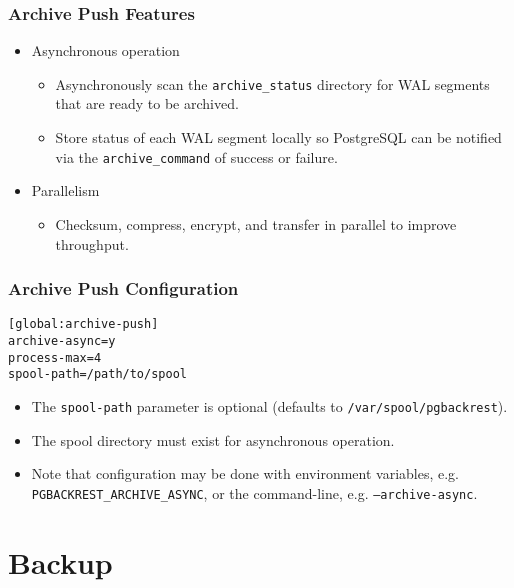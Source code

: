 \begin{frame}
    \frametitle{Archive Push Features}

    \begin{itemize}
        \item Asynchronous operation

        \begin{itemize}
            \item Asynchronously scan the \texttt{archive\_status} directory for WAL segments that are ready to be archived.\pause
            \item Store status of each WAL segment locally so PostgreSQL can be notified via the \texttt{archive\_command} of success or failure.\pause
        \end{itemize}

        \item Parallelism

        \begin{itemize}
            \item Checksum, compress, encrypt, and transfer in parallel to improve throughput.
        \end{itemize}
    \end{itemize}
\end{frame}

\begin{frame}[fragile]
    \frametitle{Archive Push Configuration}

    \vspace{.75em}\begin{lstlisting}[title=pgbackrest.conf]
[global:archive-push]
archive-async=y
process-max=4
spool-path=/path/to/spool
    \end{lstlisting}\pause\vspace{1em}

    \begin{itemize}
        \item The \texttt{spool-path} parameter is optional (defaults to \texttt{/var/spool/pgbackrest}).\pause
        \item The spool directory must exist for asynchronous operation.\pause
        \item Note that configuration may be done with environment variables, e.g. \texttt{PGBACKREST\_ARCHIVE\_ASYNC}, or the command-line, e.g. \texttt{--archive-async}.
    \end{itemize}
\end{frame}

\section{Backup}

